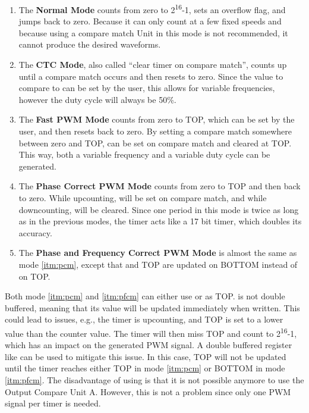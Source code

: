 \begin{enumerate}
    \item The \textbf{Normal Mode} counts from zero to 2\textsuperscript{16}-1, sets an overflow flag, and jumps back to zero. Because it can only count at a few fixed speeds and because using a compare match Unit in this mode is not recommended, it cannot produce the desired waveforms.
    \item The \textbf{CTC Mode}, also called \enquote{clear timer on compare match}, counts up until a compare match occurs and then resets to zero. Since the value to compare to can be set by the user, this allows for variable frequencies, however the duty cycle will always be 50\%.
    \item The \textbf{Fast PWM Mode} counts from zero to TOP, which can be set by the user, and then resets back to zero. By setting a compare match somewhere between zero and TOP,  can be set on compare match and cleared at TOP. This way, both a variable frequency and a variable duty cycle can be generated.\label{itm:fpm}
    \item The \textbf{Phase Correct PWM Mode} counts from zero to TOP and then back to zero. While upcounting,  will be set on compare match, and while downcounting,  will be cleared. Since one period in this mode is twice as long as in the previous modes, the timer acts like a 17 bit timer, which doubles its accuracy.\label{itm:pcm} %
    \item The \textbf{Phase and Frequency Correct PWM Mode} is almost the same as mode \ref{itm:pcm}, except that  and TOP are updated on BOTTOM instead of on TOP.\label{itm:pfcm}
\end{enumerate}

Both mode \ref{itm:pcm} and \ref{itm:pfcm} can either use  or  as TOP.  is not double buffered, meaning that its value will be updated immediately when written. This could lead to issues, e.g., the timer is upcounting, and TOP is set to a lower value than the counter value. The timer will then miss TOP and count to 2\textsuperscript{16}-1, which has an impact on the generated PWM signal. A double buffered register like  can be used to mitigate this issue. In this case, TOP will not be updated until the timer reaches either TOP in mode \ref{itm:pcm} or BOTTOM in mode \ref{itm:pfcm}. The disadvantage of using  is that it is not possible anymore to use the Output Compare Unit A. However, this is not a problem since only one PWM signal per timer is needed.

